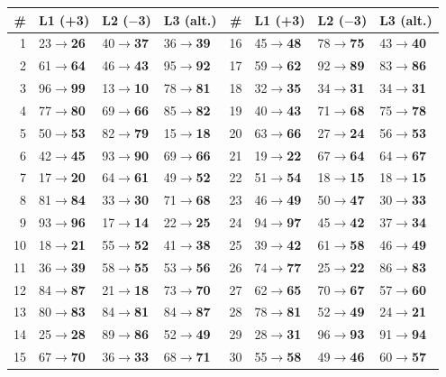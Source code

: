 \documentclass[10pt,a4paper]{article}
\begin{document}
{\small\begin{tabular}{@{}rlll@{\hspace{1.2cm}}rlll@{}}\toprule \# & L1 (+3) & L2 ($-$3) & L3 (alt.) & \# & L1 (+3) & L2 ($-$3) & L3 (alt.)\\ \midrule
1 & 23$\to$\textbf{26} & 40$\to$\textbf{37} & 36$\to$\textbf{39} & 16 & 45$\to$\textbf{48} & 78$\to$\textbf{75} & 43$\to$\textbf{40}\\
2 & 61$\to$\textbf{64} & 46$\to$\textbf{43} & 95$\to$\textbf{92} & 17 & 59$\to$\textbf{62} & 92$\to$\textbf{89} & 83$\to$\textbf{86}\\
3 & 96$\to$\textbf{99} & 13$\to$\textbf{10} & 78$\to$\textbf{81} & 18 & 32$\to$\textbf{35} & 34$\to$\textbf{31} & 34$\to$\textbf{31}\\
4 & 77$\to$\textbf{80} & 69$\to$\textbf{66} & 85$\to$\textbf{82} & 19 & 40$\to$\textbf{43} & 71$\to$\textbf{68} & 75$\to$\textbf{78}\\
5 & 50$\to$\textbf{53} & 82$\to$\textbf{79} & 15$\to$\textbf{18} & 20 & 63$\to$\textbf{66} & 27$\to$\textbf{24} & 56$\to$\textbf{53}\\
6 & 42$\to$\textbf{45} & 93$\to$\textbf{90} & 69$\to$\textbf{66} & 21 & 19$\to$\textbf{22} & 67$\to$\textbf{64} & 64$\to$\textbf{67}\\
7 & 17$\to$\textbf{20} & 64$\to$\textbf{61} & 49$\to$\textbf{52} & 22 & 51$\to$\textbf{54} & 18$\to$\textbf{15} & 18$\to$\textbf{15}\\
8 & 81$\to$\textbf{84} & 33$\to$\textbf{30} & 71$\to$\textbf{68} & 23 & 46$\to$\textbf{49} & 50$\to$\textbf{47} & 30$\to$\textbf{33}\\
9 & 93$\to$\textbf{96} & 17$\to$\textbf{14} & 22$\to$\textbf{25} & 24 & 94$\to$\textbf{97} & 45$\to$\textbf{42} & 37$\to$\textbf{34}\\
10 & 18$\to$\textbf{21} & 55$\to$\textbf{52} & 41$\to$\textbf{38} & 25 & 39$\to$\textbf{42} & 61$\to$\textbf{58} & 46$\to$\textbf{49}\\
11 & 36$\to$\textbf{39} & 58$\to$\textbf{55} & 53$\to$\textbf{56} & 26 & 74$\to$\textbf{77} & 25$\to$\textbf{22} & 86$\to$\textbf{83}\\
12 & 84$\to$\textbf{87} & 21$\to$\textbf{18} & 73$\to$\textbf{70} & 27 & 62$\to$\textbf{65} & 70$\to$\textbf{67} & 57$\to$\textbf{60}\\
13 & 80$\to$\textbf{83} & 84$\to$\textbf{81} & 84$\to$\textbf{87} & 28 & 78$\to$\textbf{81} & 52$\to$\textbf{49} & 24$\to$\textbf{21}\\
14 & 25$\to$\textbf{28} & 89$\to$\textbf{86} & 52$\to$\textbf{49} & 29 & 28$\to$\textbf{31} & 96$\to$\textbf{93} & 91$\to$\textbf{94}\\
15 & 67$\to$\textbf{70} & 36$\to$\textbf{33} & 68$\to$\textbf{71} & 30 & 55$\to$\textbf{58} & 49$\to$\textbf{46} & 60$\to$\textbf{57}\\
\bottomrule\end{tabular}}\par\medskip
\end{document}
